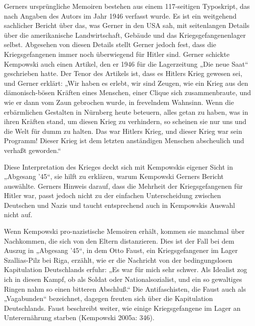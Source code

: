 \begin{multicols*}{2}
Gerners ursprüngliche Memoiren bestehen aus einem 117-seitigen Typoskript, das nach Angaben des Autors im Jahr 1946 verfasst wurde. Es ist ein weitgehend sachlicher Bericht über das, was Gerner in den USA sah, mit seitenlangen Details über die amerikanische Landwirtschaft, Gebäude und das Kriegsgefangenenlager selbst. Abgesehen von diesen Details stellt Gerner jedoch fest, dass die Kriegsgefangenen immer noch überwiegend für Hitler sind. Gerner schickte Kempowski auch einen Artikel, den er 1946 für die Lagerzeitung „Die neue Saat“ geschrieben hatte. Der Tenor des Artikels ist, dass es Hitlers Krieg gewesen sei, und Gerner erklärt: „Wir haben es erlebt, wir sind Zeugen, wie ein Krieg aus den dämonisch-bösen Kräften eines Menschen, einer Clique sich zusammenbraute, und wie er dann vom Zaun gebrochen wurde, in frevelndem Wahnsinn. Wenn die erbärmlichen Gestalten in Nürnberg heute beteuern, alles getan zu haben, was in ihren Kräften stand, um diesen Krieg zu verhindern, so scheinen sie nur uns und die Welt für dumm zu halten. Das war Hitlers Krieg, und dieser Krieg war sein Programm! Dieser Krieg ist dem letzten anständigen Menschen abscheulich und verhaßt geworden.“

Diese Interpretation des Krieges deckt sich mit Kempowskis eigener Sicht in „Abgesang ’45“, sie hilft zu erklären, warum Kempowski Gerners Bericht auswählte. Gerners Hinweis darauf, dass die Mehrheit der Kriegsgefangenen für Hitler war, passt jedoch nicht zu der einfachen Unterscheidung zwischen Deutschen und Nazis und taucht entsprechend auch in Kempowskis Auswahl nicht auf.

Wenn Kempowski pro-nazistische Memoiren erhält, kommen sie manchmal über Nachkommen, die sich von den Eltern distanzieren. Dies ist der Fall bei dem Auszug in „Abgesang ’45“, in dem Otto Faust, ein Kriegsgefangener im Lager Szallias-Pilz bei Riga, erzählt, wie er die Nachricht von der bedingungslosen Kapitulation Deutschlands erfuhr: „Es war für mich sehr schwer. Als Idealist zog ich in diesen Kampf, ob als Soldat oder Nationalsozialist, und ein so gewaltiges Ringen nahm so einen bitteren Abschluß.“ Die Antifaschisten, die Faust auch als „Vagabunden“ bezeichnet, dagegen freuten sich über die Kapitulation Deutschlands. Faust beschreibt weiter, wie einige Kriegsgefangene im Lager an Unterernährung starben (Kempowski 2005a: 346).


\end{multicols*}
